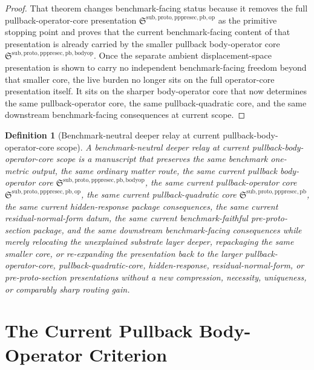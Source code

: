 \documentclass[11pt]{article}
\newcommand{\PrePreProtoSectionPullbackCore}{\mathfrak S^{\mathrm{sub,proto,pppresec,pb}}}
\newcommand{\PullbackOperatorCore}{\mathfrak S^{\mathrm{sub,proto,pppresec,pb,op}}}
\newcommand{\PullbackBodyOperatorCore}{\mathfrak S^{\mathrm{sub,proto,pppresec,pb,bodyop}}}
\newtheorem{definition}{Definition}
\begin{document}
\begin{proof}
That theorem changes benchmark-facing status because it removes the full pullback-operator-core presentation \(\PullbackOperatorCore\) as the primitive stopping point and proves that the current benchmark-facing content of that presentation is already carried by the smaller pullback body-operator core \(\PullbackBodyOperatorCore\). Once the separate ambient displacement-space presentation is shown to carry no independent benchmark-facing freedom beyond that smaller core, the live burden no longer sits on the full operator-core presentation itself. It sits on the sharper body-operator core that now determines the same pullback-operator core, the same pullback-quadratic core, and the same downstream benchmark-facing consequences at current scope.
\end{proof}

\begin{definition}[Benchmark-neutral deeper relay at current pullback-body-operator-core scope]
A \emph{benchmark-neutral deeper relay at current pullback-body-operator-core scope} is a manuscript that preserves the same benchmark one-metric output, the same ordinary matter route, the same current pullback body-operator core \(\PullbackBodyOperatorCore\), the same current pullback-operator core \(\PullbackOperatorCore\), the same current pullback-quadratic core \(\PrePreProtoSectionPullbackCore\), the same current hidden-response package consequences, the same current residual-normal-form datum, the same current benchmark-faithful pre-proto-section package, and the same downstream benchmark-facing consequences while merely relocating the unexplained substrate layer deeper, repackaging the same smaller core, or re-expanding the presentation back to the larger pullback-operator-core, pullback-quadratic-core, hidden-response, residual-normal-form, or pre-proto-section presentations without a new compression, necessity, uniqueness, or comparably sharp routing gain.
\end{definition}

\section{The Current Pullback Body-Operator Criterion}
\end{document}
